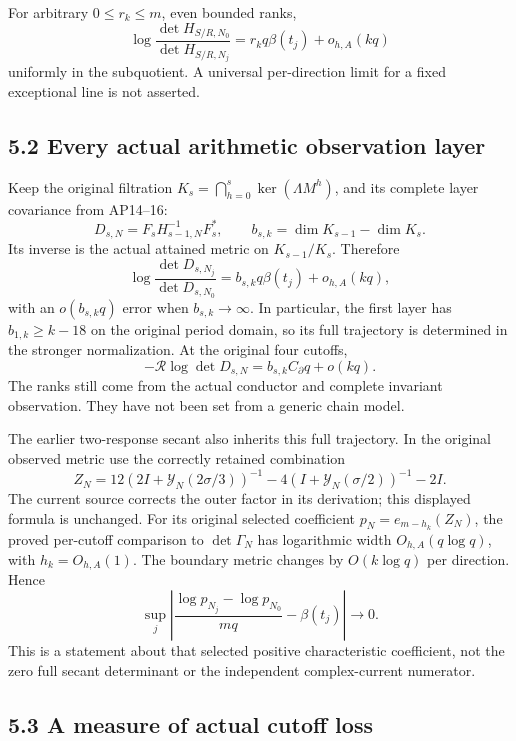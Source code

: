 \documentclass[10pt]{article}
\begin{document}
For arbitrary \(0\le r_k\le m\), even bounded ranks, \[
 \log\frac{\det H_{S/R,N_0}}{\det H_{S/R,N_j}}
 =r_kq\beta(t_j)+o_{h,A}(kq)
\] uniformly in the subquotient. A universal per-direction limit for a fixed exceptional line is not asserted.

\subsection{5.2 Every actual arithmetic observation layer}\label{every-actual-arithmetic-observation-layer}

Keep the original filtration \(K_s=\bigcap_{h=0}^s\ker(\Lambda M^h)\), and its complete layer covariance from AP14--16: \[
 D_{s,N}=F_sH_{s-1,N}^{-1}F_s^*,\qquad
 b_{s,k}=\dim K_{s-1}-\dim K_s.
\] Its inverse is the actual attained metric on \(K_{s-1}/K_s\). Therefore \[
 \boxed{\log\frac{\det D_{s,N_j}}{\det D_{s,N_0}}
 =b_{s,k}q\beta(t_j)+o_{h,A}(kq),}
 \tag{SQ3}
\] with an \(o(b_{s,k}q)\) error when \(b_{s,k}\to\infty\). In particular, the first layer has \(b_{1,k}\ge k-18\) on the original period domain, so its full trajectory is determined in the stronger normalization. At the original four cutoffs, \[
 -\mathcal R\log\det D_{s,N}
 =b_{s,k}C_\partial q+o(kq).
\] The ranks still come from the actual conductor and complete invariant observation. They have not been set from a generic chain model.

The earlier two-response secant also inherits this full trajectory. In the original observed metric use the correctly retained combination \[
 Z_N=12(2I+\mathscr Y_N(2\sigma/3))^{-1}
 -4(I+\mathscr Y_N(\sigma/2))^{-1}-2I.
\] The current source corrects the outer factor in its derivation; this displayed formula is unchanged. For its original selected coefficient \(p_N=e_{m-h_k}(Z_N)\), the proved per-cutoff comparison to \(\det\Gamma_N\) has logarithmic width \(O_{h,A}(q\log q)\), with \(h_k=O_{h,A}(1)\). The boundary metric changes by \(O(k\log q)\) per direction. Hence \[
 \boxed{\sup_j\left|
 \frac{\log p_{N_j}-\log p_{N_0}}{mq}-\beta(t_j)\right|\to0.}
 \tag{SQ4}
\] This is a statement about that selected positive characteristic coefficient, not the zero full secant determinant or the independent complex-current numerator.

\subsection{5.3 A measure of actual cutoff loss}\label{a-measure-of-actual-cutoff-loss}
\end{document}
